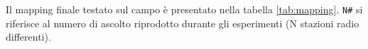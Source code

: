 \documentclass[12pt,a4paper]{report}
\newcommand{\physiradio}{Physiradio} %
\begin{document}
Il mapping finale testato sul campo è presentato nella tabella \ref{tab:mapping}. \texttt {N\#} si riferisce al numero di ascolto riprodotto durante gli esperimenti (N stazioni radio differenti).


\end{document}
